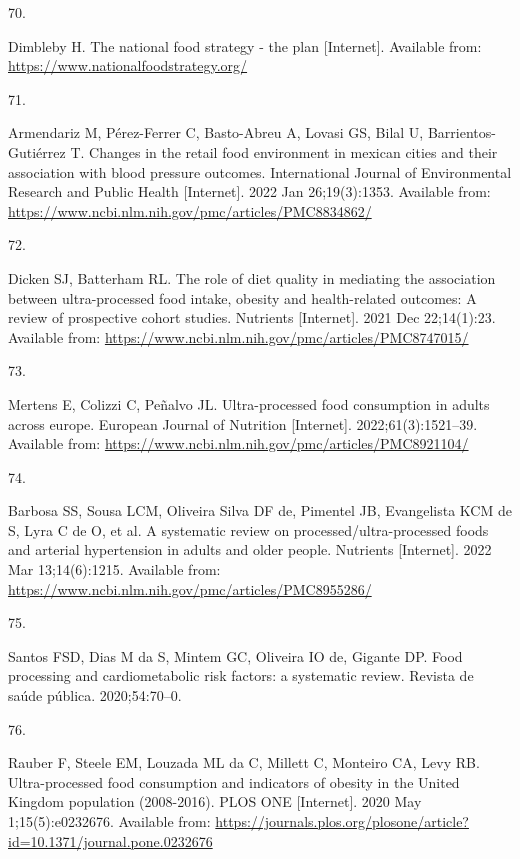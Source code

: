 \documentclass[
]{article}
\newlength{\cslhangindent}
\newlength{\csllabelwidth}
\newlength{\cslentryspacingunit} %
\newenvironment{CSLReferences}[2] %
 {%
  \setlength{\parindent}{0pt}
  \ifodd #1
  \let\oldpar\par
  \def\par{\hangindent=\cslhangindent\oldpar}
  \fi
  \setlength{\parskip}{#2\cslentryspacingunit}
 }%
 {}
\newcommand{\CSLLeftMargin}[1]{\parbox[t]{\csllabelwidth}{#1}}
\newcommand{\CSLRightInline}[1]{\parbox[t]{\linewidth - \csllabelwidth}{#1}\break}
\begin{document}
\begin{CSLReferences}{0}{0}
\leavevmode{}%
\CSLLeftMargin{70. }%
\CSLRightInline{Dimbleby H. The national food strategy - the plan
{[}Internet{]}. Available from:
\url{https://www.nationalfoodstrategy.org/}}

\leavevmode{}%
\CSLLeftMargin{71. }%
\CSLRightInline{Armendariz M, Pérez-Ferrer C, Basto-Abreu A, Lovasi GS,
Bilal U, Barrientos-Gutiérrez T. Changes in the retail food environment
in mexican cities and their association with blood pressure outcomes.
International Journal of Environmental Research and Public Health
{[}Internet{]}. 2022 Jan 26;19(3):1353. Available from:
\url{https://www.ncbi.nlm.nih.gov/pmc/articles/PMC8834862/}}

\leavevmode{}%
\CSLLeftMargin{72. }%
\CSLRightInline{Dicken SJ, Batterham RL. The role of diet quality in
mediating the association between ultra-processed food intake, obesity
and health-related outcomes: A review of prospective cohort studies.
Nutrients {[}Internet{]}. 2021 Dec 22;14(1):23. Available from:
\url{https://www.ncbi.nlm.nih.gov/pmc/articles/PMC8747015/}}

\leavevmode{}%
\CSLLeftMargin{73. }%
\CSLRightInline{Mertens E, Colizzi C, Peñalvo JL. Ultra-processed food
consumption in adults across europe. European Journal of Nutrition
{[}Internet{]}. 2022;61(3):1521--39. Available from:
\url{https://www.ncbi.nlm.nih.gov/pmc/articles/PMC8921104/}}

\leavevmode{}%
\CSLLeftMargin{74. }%
\CSLRightInline{Barbosa SS, Sousa LCM, Oliveira Silva DF de, Pimentel
JB, Evangelista KCM de S, Lyra C de O, et al. A systematic review on
processed/ultra-processed foods and arterial hypertension in adults and
older people. Nutrients {[}Internet{]}. 2022 Mar 13;14(6):1215.
Available from:
\url{https://www.ncbi.nlm.nih.gov/pmc/articles/PMC8955286/}}

\leavevmode{}%
\CSLLeftMargin{75. }%
\CSLRightInline{Santos FSD, Dias M da S, Mintem GC, Oliveira IO de,
Gigante DP. Food processing and cardiometabolic risk factors: a
systematic review. Revista de saúde pública. 2020;54:70--0. }

\leavevmode{}%
\CSLLeftMargin{76. }%
\CSLRightInline{Rauber F, Steele EM, Louzada ML da C, Millett C,
Monteiro CA, Levy RB. Ultra-processed food consumption and indicators of
obesity in the United Kingdom population (2008-2016). PLOS ONE
{[}Internet{]}. 2020 May 1;15(5):e0232676. Available from:
\url{https://journals.plos.org/plosone/article?id=10.1371/journal.pone.0232676}}


\end{CSLReferences}
\end{document}

